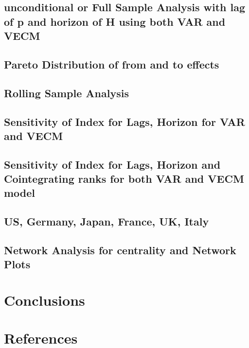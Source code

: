 \documentclass[]{elsarticle} %
\begin{document}
\subsection{unconditional or Full Sample Analysis with lag of p and
horizon of H using both VAR and
VECM}\label{unconditional-or-full-sample-analysis-with-lag-of-p-and-horizon-of-h-using-both-var-and-vecm}

\subsection{Pareto Distribution of from and to
effects}\label{pareto-distribution-of-from-and-to-effects}

\subsection{Rolling Sample Analysis}\label{rolling-sample-analysis}

\subsection{Sensitivity of Index for Lags, Horizon for VAR and
VECM}\label{sensitivity-of-index-for-lags-horizon-for-var-and-vecm}

\subsection{Sensitivity of Index for Lags, Horizon and Cointegrating
ranks for both VAR and VECM
model}\label{sensitivity-of-index-for-lags-horizon-and-cointegrating-ranks-for-both-var-and-vecm-model}

\subsection{US, Germany, Japan, France, UK,
Italy}\label{us-germany-japan-france-uk-italy}

\subsection{Network Analysis for centrality and Network
Plots}\label{network-analysis-for-centrality-and-network-plots}

\section{Conclusions}\label{conclusions}

\section*{References}\label{references}
\end{document}
